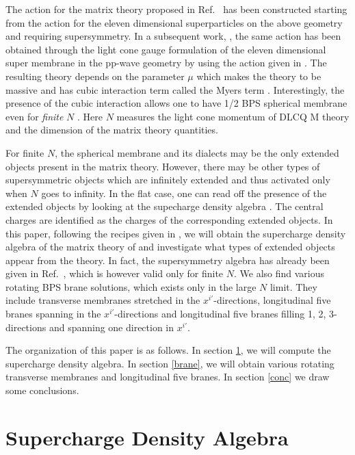 \documentclass[a4paper,12pt]{article}
\begin{document}
The action for the matrix theory proposed in Ref.~\cite{ber021}
has been constructed starting from the action for the eleven
dimensional superparticles on the above geometry and requiring
supersymmetry.  In a subsequent work, \cite{das185}, the same
action has been obtained through the light cone gauge formulation
of the eleven dimensional super membrane in the pp-wave geometry
by using the action given in \cite{dew209,cla045}. The resulting
theory depends on the parameter $\mu$ which makes the theory to be
massive and has cubic interaction term called the Myers term
\cite{mye053}. Interestingly, the presence of the cubic
interaction allows one to have 1/2 BPS spherical membrane even for
{\em finite} $N$ \cite{ber021,das185}. Here $N$ measures the light
cone momentum of DLCQ M theory and the dimension of the matrix
theory quantities.

For finite $N$, the spherical membrane and its dialects may be the
only extended objects present in the matrix theory.  However,
there may be other types of supersymmetric objects which are
infinitely extended and thus activated only when $N$ goes to
infinity.  In the flat case, one can read off the presence of the
extended objects by looking at the supecharge density algebra
\cite{ban157}.  The central charges are identified as the charges
of the corresponding extended objects.  In this paper, following
the recipes given in \cite{ban157}, we will obtain the supercharge
density algebra of the matrix theory of \cite{ber021,das185} and
investigate what types of extended objects appear from the theory.
In fact, the supersymmetry algebra has already been given in
Ref.~\cite{das185}, which is however valid only for finite $N$. We
also find various rotating BPS brane solutions, which exists only
in the large $N$ limit. They include transverse membranes
stretched in the $x^{i'}$-directions, longitudinal five branes
spanning in the $x^{i'}$-directions and longitudinal five branes
filling 1, 2, 3-directions and spanning one direction in $x^{i'}$.

The organization of this paper is as follows.  In section
\ref{alg}, we will compute the supercharge density algebra. In
section \ref{brane}, we will obtain various rotating transverse
membranes and longitudinal five branes. In section \ref{conc} we
draw some conclusions.



\section{Supercharge Density Algebra}
\label{alg}
\end{document}
